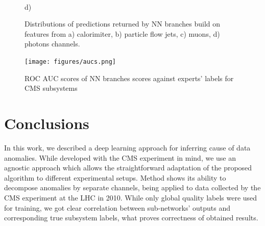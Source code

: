 \documentclass[a4paper]{jpconf}
\begin{document}
\begin{figure}[H]
\begin{minipage}[h!]{0.47\linewidth}
\end{minipage}
\hfill
\begin{minipage}[h!]{0.47\linewidth}
 \\ d) 
\end{minipage}
\caption{Distributions of predictions returned by NN branches build on features from a) calorimiter, b) particle flow jets, c) muons, d) photons
channels.}
\label{ris:experimentalcorrelationsignals}
\end{figure}


\begin{figure}[H]
\begin{center}
\texttt{[image: figures/aucs.png]}
\end{center}
\caption{\label{label}ROC AUC scores of NN branches scores against experts' labels for CMS subsystems}
\end{figure}


\section{Conclusions}
In this work, we described a deep learning approach for inferring cause of data anomalies. While developed
with the CMS experiment in mind, we use an agnostic approach which allows the straightforward
adaptation of the proposed algorithm to different experimental setups. Method shows its ability to decompose anomalies by separate channels, being applied to data collected by the CMS experiment at the LHC in 2010. While only global quality labels were used for training, we got clear correlation between sub-networks’ outputs and corresponding true subsystem labels, what proves correctness of obtained results.
\end{document}

